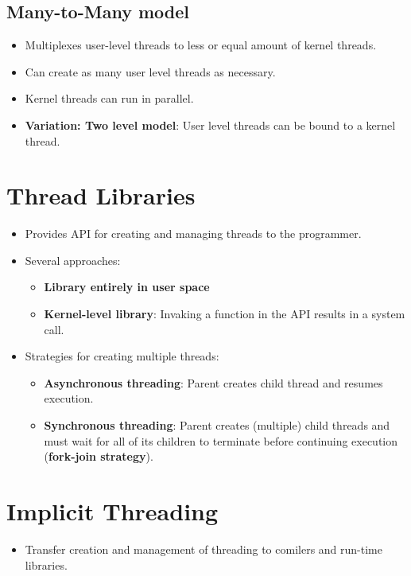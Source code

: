\documentclass[10pt]{report}
\begin{document}
		\subsection{Many-to-Many model}
			\begin{itemize}
				\item Multiplexes user-level threads to less or equal amount of kernel threads.
				\item Can create as many user level threads as necessary.
				\item Kernel threads can run in parallel.
				\item \textbf{Variation: Two level model}: User level threads can be bound to a kernel thread.
			\end{itemize}

	\section{Thread Libraries}
		\begin{itemize}
			\item Provides API for creating and managing threads to the programmer.
			\item Several approaches:
			\begin{itemize}
				\item \textbf{Library entirely in user space}
				\item \textbf{Kernel-level library}: Invaking a function in the API results in a system call.
			\end{itemize}
			\item Strategies for creating multiple threads:
			\begin{itemize}
				\item \textbf{Asynchronous threading}: Parent creates child thread and resumes execution.
				\item \textbf{Synchronous threading}: Parent creates (multiple) child threads and must wait for all of its children to terminate before continuing execution (\textbf{fork-join strategy}).
			\end{itemize}
		\end{itemize}

	\section{Implicit Threading}
		\begin{itemize}
			\item Transfer creation and management of threading to comilers and run-time libraries.
		\end{itemize}
\end{document}
